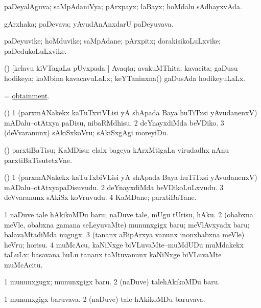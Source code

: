 \bentry
{}
\gl{\gu}
\bmng
paDeyalAguva; saMpAdaniVya; pArxpayx; laBayx; hoMdalu sAdhayxvAda. 
\emng
\eentry

\bentry
{}
\gl{\nA}
\bmng
gArxhaka; paDevava; yAvudAnAnxdarU paDeyuvava. 
\emng
\eentry

\bentry
{}
\gl{\nA}
\bmng
paDeyuvike; hoMduvike; saMpAdane; pArxpitx; dorakisikoLuLxvike; paDedukoLuLxvike. 
\emng
\eentry

\bentry
{}
\gl{\gu}
\bmng
(\pArxvi) [kelavu kiVTagaLa pUyxpada  \vi] Avaqta; avakuMThita; kavacita; gaDusu hodikeya; koMbina kavacavuLaLx; keYTaninxna() gaDusAda hodikeyuLaLx. 
\emng
\eentry

\bentry
{}
\gl{\nA}
\bmng
= \hyperlink{obtainment}{obtainment}. 
\emng
\eentry

\bentry
{}
\gl{\sakirx}
\bmng
(\pArxparx) 
\bnum
\num{1} (parxmANakekx kaTuTxviVLisi yA shApada Baya huTiTxsi yAvudanenxV) mADalu--otAtxya paDisu, nibaRMdhisu. 
\num{2} deYnayxdiMda beVDiko. 
\num{3} (deVvaranunx) sAkiSxkoVru; sAkiSxgAgi moreyiDu. 
\enum
\emng

\noindent
\gl{\akirx}
\bmng
(\pArxparx) parxtiBaTisu; KaMDisu:  elalx bageya kArxMtigaLa virudadhx nAnu parxtiBaTisutetxVne. 
\emng
\eentry

\bentry
{}
\gl{\nA}
\bmng
(\pArxparx) 
\bnum
\num{1} (parxmANakekx kaTuTxbiVLisi yA shApada Baya huTiTxsi yAvudanenxV) mADalu--otAtxyapaDisuvudu. 
\num{2} deYnayxdiMda beVDikoLuLxvudu. 
\num{3} deVvaranunx sAkiSx koVruvudu. 
\num{4} KaMDane; parxtiBaTane. 
\enum
\emng
\eentry

\bentry
{}
\gl{\sakirx}
\bmng
\bnum
\num{1} naDuve tale hAkikoMDu baru; naDuve tale, mUgu tUrisu, hAku. 
\num{2} (obabxna meVle, obabxna gamana seLeyuvaMte) mununxgigx baru; meVlAvxyadx baru; balavaMtadiMda nugugx. 
\num{3} (tananx aBipArxya \mo vanunx inonxbabxna meVle) heVru; horisu. 
\num{4} muMcAcu, kaNiNxge biVLuvaMte--muMdUDu muMdakekx taLuLx:  basavana huLu tananx taMtuvanunx kaNiNxge biVLuvaMte muMcAcitu. 
\enum
\emng

\noindent
\gl{\akirx}
\bmng
\bnum
\num{1} mununxgugx; mununxgigx baru. 
\num{2} (naDuve) talehAkikoMDu baru. 
\enum
\emng
\eentry

\bentry
{}
\gl{\nA}
\bmng
\bnum
\num{1} mununxgigx baruvava. 
\num{2} (naDuve) tale hAkikoMDu baruvava. 
\enum
\emng
\eentry

